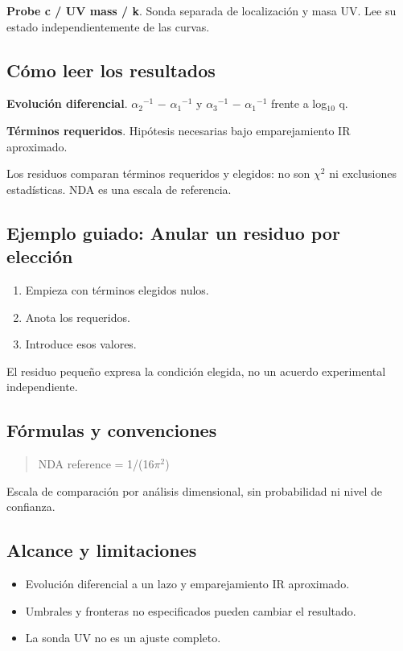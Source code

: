 \documentclass[11pt,a4paper]{article}
\begin{document}
\textbf{Probe c / UV mass / k}. Sonda separada de localización y masa UV. Lee su estado independientemente de las curvas.

\subsection*{Cómo leer los resultados}
\textbf{Evolución diferencial}. \ensuremath{\alpha}\ensuremath{{}_{2}}\ensuremath{{}^{-1}} \ensuremath{-} \ensuremath{\alpha}\ensuremath{{}_{1}}\ensuremath{{}^{-1}} y \ensuremath{\alpha}\ensuremath{{}_{3}}\ensuremath{{}^{-1}} \ensuremath{-} \ensuremath{\alpha}\ensuremath{{}_{1}}\ensuremath{{}^{-1}} frente a log\ensuremath{{}_{10}} q.

\textbf{Términos requeridos}. Hipótesis necesarias bajo emparejamiento IR aproximado.

Los residuos comparan términos requeridos y elegidos: no son \ensuremath{\chi}\ensuremath{{}^{2}} ni exclusiones estadísticas. NDA es una escala de referencia.
\subsection*{Ejemplo guiado: Anular un residuo por elección}
\begin{enumerate}
\item Empieza con términos elegidos nulos.
\item Anota los requeridos.
\item Introduce esos valores.
\end{enumerate}
El residuo pequeño expresa la condición elegida, no un acuerdo experimental independiente.
\subsection*{Fórmulas y convenciones}
\begin{quote}NDA reference = 1/(16\ensuremath{\pi}\ensuremath{{}^{2}})\end{quote}
Escala de comparación por análisis dimensional, sin probabilidad ni nivel de confianza.

\subsection*{Alcance y limitaciones}
\begin{itemize}
\item Evolución diferencial a un lazo y emparejamiento IR aproximado.
\item Umbrales y fronteras no especificados pueden cambiar el resultado.
\item La sonda UV no es un ajuste completo.
\end{itemize}
\end{document}
